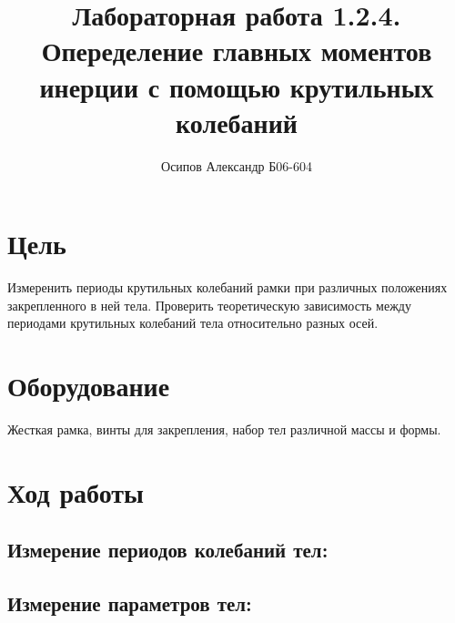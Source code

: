 \documentclass[12pt]{extarticle}
\begin{document}
\author{Осипов Александр Б06-604}
\title{Лабораторная работа 1.2.4. Опеределение главных моментов инерции с помощью крутильных колебаний}
\section{Цель}

Измеренить периоды крутильных колебаний рамки при различных положениях закрепленного в ней тела.
Проверить теоретическую зависимость между периодами крутильных колебаний тела относительно разных осей.

\section{Оборудование}

Жесткая рамка, винты для закрепления, набор тел различной массы и формы.

\section{Ход работы}

\subsection{Измерение периодов колебаний тел:}

\subsection{Измерение параметров тел:}


\vspace{5mm}
\end{document}
